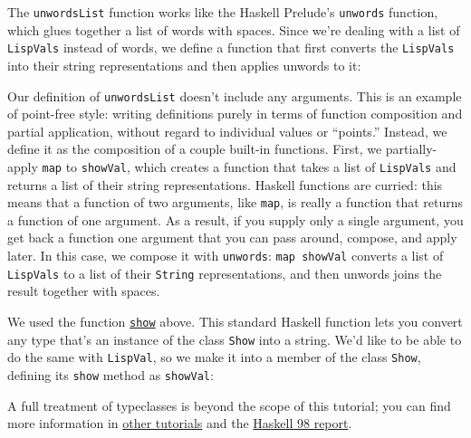 The \verb|unwordsList| function works like the Haskell Prelude's \verb|unwords| function, which glues together a list of words with spaces. Since we're dealing with a list of \verb|LispVals| instead of words, we define a function that first converts the \verb|LispVals| into their string representations and then applies unwords to it:
 
 
Our definition of \verb|unwordsList| doesn't include any arguments. This is an example of point-free style: writing definitions purely in terms of function composition and partial application, without regard to individual values or ``points.'' Instead, we define it as the composition of a couple built-in functions. First, we partially-apply \verb|map| to \verb|showVal|, which creates a function that takes a list of \verb|LispVals| and returns a list of their string representations. Haskell functions are curried: this means that a function of two arguments, like \verb|map|, is really a function that returns a function of one argument. As a result, if you supply only a single argument, you get back a function one argument that you can pass around, compose, and apply later. In this case, we compose it with \verb|unwords|: \lstinline|map showVal| converts a list of \verb|LispVals| to a list of their \verb|String| representations, and then unwords joins the result together with spaces.
 
We used the function \href{http://www.haskell.org/onlinereport/standard-prelude.html\#tShow}{\texttt{show}} above. This standard Haskell function lets you convert any type that's an instance of the class \verb|Show| into a string. We'd like to be able to do the same with \verb|LispVal|, so we make it into a member of the class \verb|Show|, defining its \verb|show| method as \verb|showVal|:
 
 
A full treatment of typeclasses is beyond the scope of this tutorial; you can find more information in \href{http://www.haskell.org/tutorial/classes.html}{other tutorials} and the \href{http://www.haskell.org/onlinereport/decls.html\#sect4.3}{Haskell 98 report}.
 
